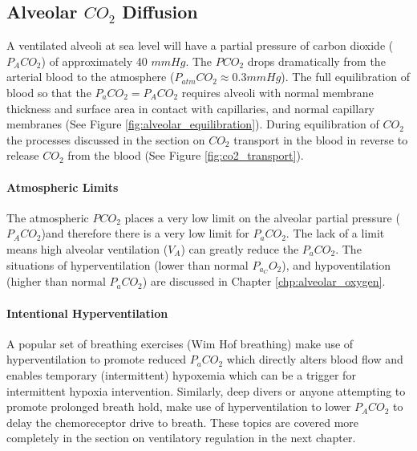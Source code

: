 
\subsection{Alveolar $CO_2$ Diffusion}

A ventilated alveoli at sea level will have a partial pressure of carbon dioxide ($P_ACO_2$) of approximately 40 $mmHg$. The $PCO_2$ drops dramatically from the arterial blood to the atmosphere ($P_{atm}CO_2 \approx 0.3 mmHg$). The full equilibration of blood so that the $P_aCO_2 = P_ACO_2$ requires alveoli with normal membrane thickness and surface area in contact with capillaries, and normal capillary membranes (See Figure \ref{fig:alveolar_equilibration}). During equilibration of $CO_2$ the processes discussed in the section on $CO_2$ transport in the blood in reverse to release $CO_2$ from the blood (See Figure \ref{fig:co2_transport}). 

\paragraph{Atmospheric Limits}

The atmospheric $PCO_2$ places a very low limit on the alveolar partial pressure ($P_ACO_2$)and therefore there is a very low limit for $P_aCO_2$. The lack of a limit means high alveolar ventilation ($V_A$) can greatly reduce the $P_aCO_2$. The situations of hyperventilation (lower than normal $P_a_CO_2$), and hypoventilation (higher than normal $P_aCO_2$) are discussed in Chapter \ref{chp:alveolar_oxygen}. 

\paragraph{Intentional Hyperventilation}
A popular set of breathing exercises (Wim Hof breathing) make use of hyperventilation to promote reduced $P_aCO_2$ which directly alters blood flow and enables temporary (intermittent) hypoxemia which can be a trigger for intermittent hypoxia intervention. Similarly, deep divers or anyone attempting to promote prolonged breath hold, make use of hyperventilation to lower $P_ACO_2$ to delay the chemoreceptor drive to breath. These topics are covered more completely in the section on ventilatory regulation in the next chapter.

